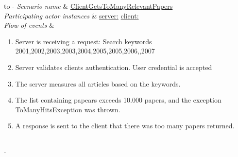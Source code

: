 %
%
\begin{table}[h!]
	\tabulinesep=1.5mm
	\begin{tabu} to 
		\tabucline[1.5pt]-
		\textit{Scenario name} & \underline{ClientGetsToManyRelevantPapers} \\
		\hline
		\textit{Participating actor \newline instances} & \underline{server:\serverside}
		\newline \underline{client:\clientside} \\
		\hline
		\textit{Flow of events} &
		\vspace{-3mm}
		\begin{enumerate}[leftmargin=*,topsep=0pt,itemsep=-1ex]
			\item Server is receiving a request: Search keywords {2001,2002,2003,2003,2004,2005,2005,2006,,2007}
						
			\item Server validates clients authentication. User credential is accepted
			
			\item The server measures all articles based on the keywords.
			
			\item The list containing papears exceeds 10.000 papers, and the exception ToManyHitsException was thrown.
			
			\item A response is sent to the client that there was too many papers returned.\\				
		\end{enumerate} \\
		\tabucline[1.5pt]-
	\end{tabu}
	\caption{Scenario when a user has requested to many papers during one request.}
	\label{sc:ClientGetsToManyRelevantPapers}
\end{table}


